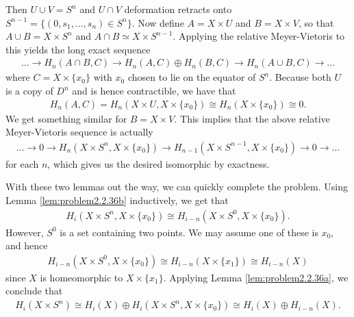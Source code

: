 \begin{homework}[e]
\begin{prf}
\begin{prf}
\begin{center}
        \label{fig:prob7-1}
      \end{center}
      Then $U\cup V = S^n$ and $U\cap V$ deformation retracts onto $S^{n-1} = \{(0,s_1,...,s_n) \in S^n\}$. Now define $A = X\times U$ and $B = X\times V$, so that $A\cup B = X\times S^n$ and $A\cap B \simeq X\times S^{n-1}$. Applying the relative Meyer-Vietoris to this yields the long exact sequence
      \begin{align*}
        ... \to H_n(A\cap B, C) \to H_n(A,C) \oplus H_n(B,C) \to H_n(A\cup B,C) \to ...
      \end{align*}
      where $C = X\times \{x_0\}$ with $x_0$ chosen to lie on the equator of $S^n$. Because both $U$ is a copy of $D^n$ and is hence contractible, we have that
      \begin{align*}
        H_n(A,C) = H_n(X\times U, X\times \{x_0\}) \cong H_n(X\times \{x_0\}) \cong 0.
      \end{align*}
      We get something similar for $B = X\times V$. This implies that the above relative Meyer-Vietoris sequence is actually
      \begin{align*}
        ... \to 0 \to H_n(X\times S^{n}, X\times \{x_0\})\to H_{n-1}(X\times S^{n-1}, X\times \{x_0\})\to 0 \to ...
      \end{align*}
      for each $n$, which gives us the desired isomorphic by exactness.
    \end{prf}
    With these two lemmas out the way, we can quickly complete the problem. Using Lemma \ref{lem:problem2.2.36b} inductively, we get that
    \begin{align*}
      H_i(X\times S^n,X\times \{x_0\}) \cong H_{i - n}(X\times S^0,X\times \{x_0\}).
    \end{align*}
    However, $S^0$ is a set containing two points. We may assume one of these is $x_0$, and hence 
    \begin{align*}
      H_{i-n}(X\times S^0,X\times \{x_0\})\cong H_{i-n}(X\times \{x_1\})\cong H_{i-n}(X)
    \end{align*}
    since $X$ is homeomorphic to $X \times \{x_1\}$. Applying Lemma \ref{lem:problem2.2.36a}, we conclude that
    \begin{align*}
      H_i(X\times S^n) \cong H_i(X) \oplus H_i(X\times S^n,X\times \{x_0\}) \cong H_i(X) \oplus H_{i-n}(X).
    \end{align*}
  \end{prf}
\end{homework}

